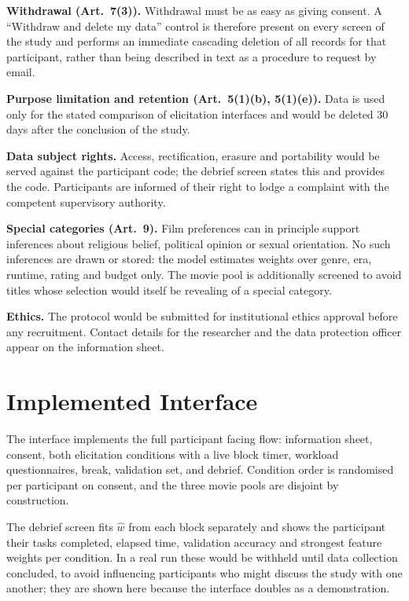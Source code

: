 \documentclass[11pt]{article}
\begin{document}
\textbf{Withdrawal (Art.~7(3)).} Withdrawal must be as easy as giving consent. A ``Withdraw and delete my data'' control is therefore present on every screen of the study and performs an immediate cascading deletion of all records for that participant, rather than being described in text as a procedure to request by email.

\textbf{Purpose limitation and retention (Art.~5(1)(b), 5(1)(e)).} Data is used only for the stated comparison of elicitation interfaces and would be deleted 30 days after the conclusion of the study.

\textbf{Data subject rights.} Access, rectification, erasure and portability would be served against the participant code; the debrief screen states this and provides the code. Participants are informed of their right to lodge a complaint with the competent supervisory authority.

\textbf{Special categories (Art.~9).} Film preferences can in principle support inferences about religious belief, political opinion or sexual orientation. No such inferences are drawn or stored: the model estimates weights over genre, era, runtime, rating and budget only. The movie pool is additionally screened to avoid titles whose selection would itself be revealing of a special category.

\textbf{Ethics.} The protocol would be submitted for institutional ethics approval before any recruitment. Contact details for the researcher and the data protection officer appear on the information sheet.

\section{Implemented Interface}
\label{sec:interface}
The interface implements the full participant facing flow: information sheet, consent, both elicitation conditions with a live block timer, workload questionnaires, break, validation set, and debrief. Condition order is randomised per participant on consent, and the three movie pools are disjoint by construction.

The debrief screen fits $\hat{w}$ from each block separately and shows the participant their tasks completed, elapsed time, validation accuracy and strongest feature weights per condition. In a real run these would be withheld until data collection concluded, to avoid influencing participants who might discuss the study with one another; they are shown here because the interface doubles as a demonstration.
\end{document}
